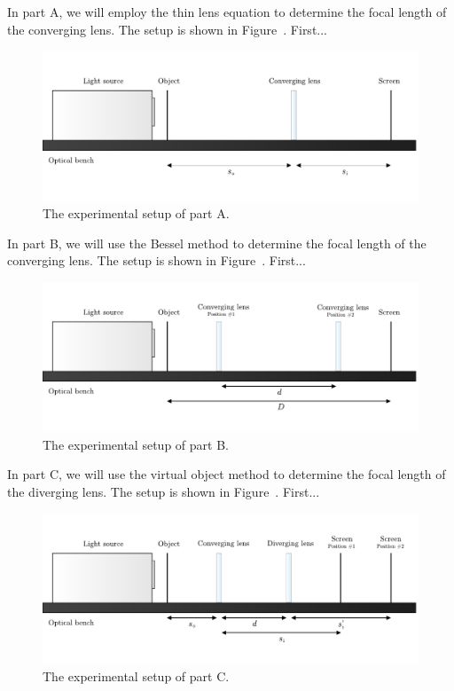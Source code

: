 \documentclass[10pt]{article}
\begin{document}
In part A, we will employ the thin lens equation to determine the focal length of the converging lens. The setup is shown in Figure~. First...

\begin{figure}[h]
  \centering
  \includegraphics[scale=0.6]{figures/f1.pdf}
  \caption{The experimental setup of part A.}
  \label{fig:1}
\end{figure}

In part B, we will use the Bessel method to determine the focal length of the converging lens. The setup is shown in Figure~. First...

\begin{figure}[h]
  \centering
  \includegraphics[scale=0.6]{figures/f2.pdf}
  \caption{The experimental setup of part B.}
  \label{fig:2}
\end{figure}

In part C, we will use the virtual object method to determine the focal length of the diverging lens. The setup is shown in Figure~. First...

\begin{figure}[h]
  \centering
  \includegraphics[scale=0.6]{figures/f3.pdf}
  \caption{The experimental setup of part C.}
  \label{fig:3}
\end{figure}
\end{document}
